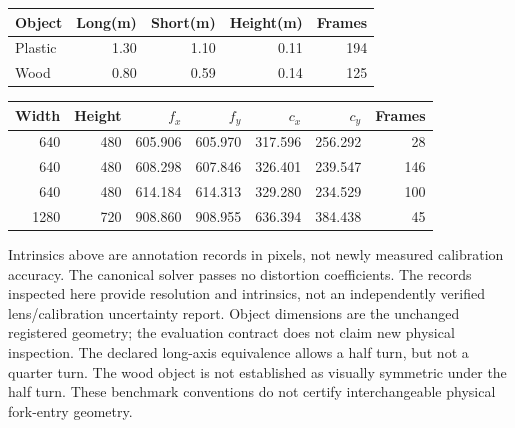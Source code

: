 \begin{longtable}{lrrrr}\toprule Object & Long(m) & Short(m) & Height(m) & Frames\\\midrule
Plastic & 1.30 & 1.10 & 0.11 & 194 \\
Wood & 0.80 & 0.59 & 0.14 & 125 \\
\bottomrule\end{longtable}
\begin{longtable}{rrrrrrr}\toprule Width & Height & $f_x$ & $f_y$ & $c_x$ & $c_y$ & Frames\\\midrule
640 & 480 & 605.906 & 605.970 & 317.596 & 256.292 & 28 \\
640 & 480 & 608.298 & 607.846 & 326.401 & 239.547 & 146 \\
640 & 480 & 614.184 & 614.313 & 329.280 & 234.529 & 100 \\
1280 & 720 & 908.860 & 908.955 & 636.394 & 384.438 & 45 \\
\bottomrule\end{longtable}
Intrinsics above are annotation records in pixels, not newly measured calibration accuracy. The canonical solver passes no distortion coefficients. The records inspected here provide resolution and intrinsics, not an independently verified lens/calibration uncertainty report. Object dimensions are the unchanged registered geometry; the evaluation contract does not claim new physical inspection. The declared long-axis equivalence allows a half turn, but not a quarter turn. The wood object is not established as visually symmetric under the half turn. These benchmark conventions do not certify interchangeable physical fork-entry geometry.
